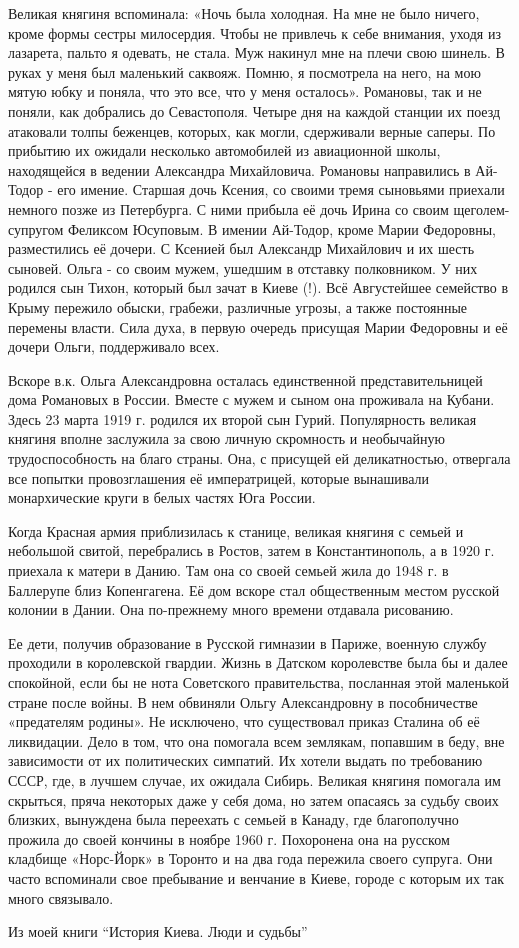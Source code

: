Великая княгиня вспоминала: «Ночь была
холодная. На мне не было ничего, кроме формы сестры милосердия. Чтобы не
привлечь к себе внимания, уходя из лазарета, пальто я одевать, не стала. Муж
накинул мне на плечи свою шинель. В руках у меня был маленький саквояж. Помню,
я посмотрела на него, на мою мятую юбку и поняла, что это все, что у меня
осталось». Романовы, так и не поняли, как добрались до Севастополя. Четыре дня
на каждой станции их поезд атаковали толпы беженцев, которых, как могли,
сдерживали верные саперы. По прибытию их ожидали несколько автомобилей из
авиационной школы, находящейся в ведении Александра Михайловича. Романовы
направились в Ай-Тодор - его имение. Старшая дочь Ксения, со своими тремя
сыновьями приехали немного позже из Петербурга. С ними прибыла её дочь Ирина со
своим щеголем-супругом Феликсом Юсуповым. В имении Ай-Тодор, кроме Марии
Федоровны, разместились её дочери. С Ксенией был Александр Михайлович и их
шесть сыновей. Ольга - со своим мужем, ушедшим в отставку полковником. У них
родился сын Тихон, который был зачат в Киеве (!). Всё Августейшее семейство в
Крыму пережило обыски, грабежи, различные угрозы, а также постоянные перемены
власти. Сила духа, в первую очередь присущая Марии Федоровны и её дочери Ольги,
поддерживало всех.

Вскоре в.к. Ольга Александровна осталась единственной представительницей дома
Романовых в России. Вместе с мужем и сыном она проживала на Кубани. Здесь 23
марта 1919 г. родился их второй сын Гурий. Популярность великая княгиня вполне
заслужила за свою личную скромность и необычайную трудоспособность на благо
страны. Она, с присущей ей деликатностью, отвергала все попытки провозглашения
её императрицей, которые вынашивали монархические круги в белых частях Юга
России.

Когда Красная армия приблизилась к станице, великая княгиня с семьей и
небольшой свитой, перебрались в Ростов, затем в Константинополь, а в 1920 г.
приехала к матери в Данию. Там она со своей семьей жила до 1948 г. в Баллерупе
близ Копенгагена. Её дом вскоре стал общественным местом русской колонии в
Дании. Она по-прежнему много времени отдавала рисованию. 

Ее дети, получив образование в Русской гимназии в Париже, военную службу
проходили в королевской гвардии. Жизнь в Датском королевстве была бы и далее
спокойной, если бы не нота Советского правительства, посланная этой маленькой
стране после войны. В нем обвиняли Ольгу Александровну в пособничестве
«предателям родины». Не исключено, что существовал приказ Сталина об её
ликвидации. Дело в том, что она помогала всем землякам, попавшим в беду, вне
зависимости от их политических симпатий. Их хотели выдать по требованию СССР,
где, в лучшем случае, их ожидала Сибирь.  Великая княгиня помогала им скрыться,
пряча некоторых даже у себя дома, но затем опасаясь за судьбу своих близких,
вынуждена была переехать с семьей в Канаду, где благополучно прожила до своей
кончины в ноябре 1960 г. Похоронена она на русском кладбище «Норс-Йорк» в
Торонто и на два года пережила своего супруга. Они часто вспоминали свое
пребывание и венчание в Киеве, городе с которым их так много связывало.

Из моей книги \enquote{История Киева. Люди и судьбы}
